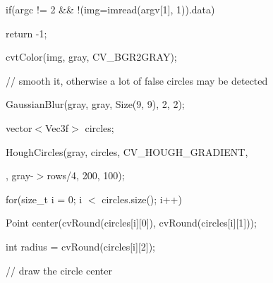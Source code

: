 {\ttfamily }

{\ttfamily }

{\ttfamily if(argc != 2 \&\& !(img=imread(argv\mbox{[}1\mbox{]}, 1)).data)}

{\ttfamily }

{\ttfamily }

{\ttfamily return -\/1;}

{\ttfamily }

{\ttfamily }

{\ttfamily cvt\+Color(img, gray, C\+V\+\_\+\+B\+G\+R2\+G\+R\+A\+Y);}

{\ttfamily }

{\ttfamily }

{\ttfamily // smooth it, otherwise a lot of false circles may be detected}

{\ttfamily }

{\ttfamily }

{\ttfamily Gaussian\+Blur(gray, gray, Size(9, 9), 2, 2);}

{\ttfamily }

{\ttfamily }

{\ttfamily vector$<$\+Vec3f$>$ circles;}

{\ttfamily }

{\ttfamily }

{\ttfamily Hough\+Circles(gray, circles, C\+V\+\_\+\+H\+O\+U\+G\+H\+\_\+\+G\+R\+A\+D\+I\+E\+NT,}

{\ttfamily }

{\ttfamily }

{, gray-\/$>$rows/4, 200, 100);}

{\ttfamily }

{\ttfamily }

{\ttfamily for(size\+\_\+t i = 0; i $<$ circles.\+size(); i++)}

{\ttfamily }

{\ttfamily }

{\ttfamily Point center(cv\+Round(circles\mbox{[}i\mbox{]}\mbox{[}0\mbox{]}), cv\+Round(circles\mbox{[}i\mbox{]}\mbox{[}1\mbox{]}));}

{\ttfamily }

{\ttfamily }

{\ttfamily int radius = cv\+Round(circles\mbox{[}i\mbox{]}\mbox{[}2\mbox{]});}

{\ttfamily }

{\ttfamily }

{\ttfamily // draw the circle center}

{\ttfamily }


